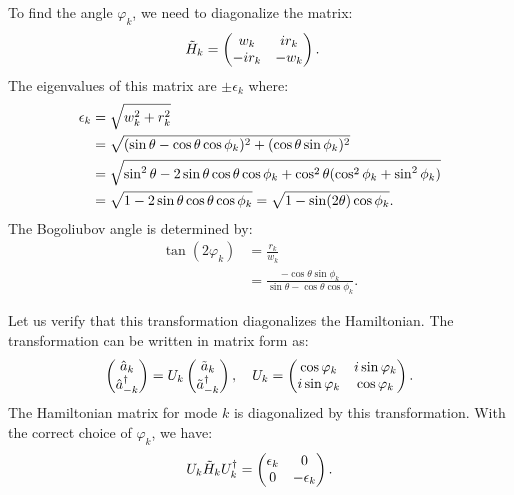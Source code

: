 \documentclass[aps,prx,twocolumn,superscriptaddress,nofootinbib,nolongbibliography,nobalancelastpage,10pt,floatfix]{revtex4-2}
\begin{document}
To find the angle $\varphi_k$, we need to diagonalize the matrix:
\begin{align}
    \tilde{H}_k &=
    \begin{pmatrix}
        w_k   &ir_k\\
        -ir_k &-w_k
    \end{pmatrix}.
\end{align}
The eigenvalues of this matrix are $\pm\epsilon_k$ where:
\begin{align}
    \epsilon_k &= \sqrt{w_k^2 + r_k^2}\\
               &= \sqrt{(\sin\theta - \cos\theta\cos\phi_k)^2 + (\cos\theta\sin\phi_k)^2}\nonumber\\
               &= \sqrt{\sin^2\theta - 2\sin\theta\cos\theta\cos\phi_k + \cos^2\theta(\cos^2\phi_k+\sin^2\phi_k)}\nonumber\\
               &= \sqrt{1 - 2\sin\theta\cos\theta\cos\phi_k}
               = \sqrt{1 - \sin(2\theta)\cos\phi_k}.
\end{align}
The Bogoliubov angle is determined by:
\begin{align}
    \tan(2\varphi_k) &= \frac{r_k}{w_k}\\
                     &= \frac{-\cos\theta\sin\phi_k}{\sin\theta - \cos\theta\cos\phi_k}.
\end{align}

Let us verify that this transformation diagonalizes the Hamiltonian. The transformation can be written in matrix form as:
\begin{align}
    \begin{pmatrix}
        \hat{a}_k\\
        \hat{a}_{-k}^\dag
    \end{pmatrix}
    = U_k
    \begin{pmatrix}
        \tilde{a}_k\\
        \tilde{a}_{-k}^\dag
    \end{pmatrix},
    \quad
    U_k =
    \begin{pmatrix}
        \cos\varphi_k  & i\sin\varphi_k\\
        i\sin\varphi_k &\cos\varphi_k
    \end{pmatrix}.
\end{align}
The Hamiltonian matrix for mode $k$ is diagonalized by this transformation.
With the correct choice of $\varphi_k$, we have:
\begin{align}
    U_k \tilde{H}_k U_k^\dag =
    \begin{pmatrix}
        \epsilon_k &0\\
        0          &-\epsilon_k
    \end{pmatrix}.
\end{align}
\end{document}
